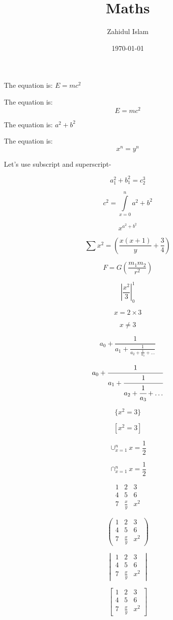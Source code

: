 \documentclass{article}
\title{Maths}
\author{Zahidul Islam }
\date{\today}
\begin{document}
\maketitle

The equation is: $E=mc^2$

The equation is: $$E=mc^2$$

The equation is: \(a^2 + b^2\)

The equation is: \[x^n = y^n\]

Let's use subscript and superscript-

$$a_1^2 + b_1^2 = c_2^3$$

$$c^2 = \int \limits_{x=0}^n a^2 + b^2 $$

$$x^{a^2+b^2}$$

$$\sum{x^2} = \left(\frac{x(x+1)}{y} + \frac{3}{4}\right) $$

$$F = G\left(\frac{m_1m_2}{r^2}\right)$$

$$\left|\frac{x^2}{3}\right|_0^1$$

$$ x = 2 \times 3 $$

$$ x \neq 3 $$

$$ a_0 + \frac{1}{a_1 + \frac{1}{a_2 + \frac{1}{a_3} + \dots}} $$

$$ a_0 + \cfrac{1}{a_1 + \cfrac{1}{a_2 + \cfrac{1}{a_3} + \dots}} $$

$$\{x^2=3\}$$

$$[x^2=3]$$

$$\cup_{x=1}^{n}x = \frac{1}{2}$$

$$\cap_{x=1}^{n}x = \frac{1}{2}$$

$$
\begin{matrix}
1 & 2 & 3\\
4 & 5 & 6\\
7 & \frac{x}{y} & x^2
\end{matrix}
$$

$$
\begin{pmatrix}
1 & 2 & 3\\
4 & 5 & 6\\
7 & \frac{x}{y} & x^2
\end{pmatrix}
$$

$$
\begin{vmatrix}
1 & 2 & 3\\
4 & 5 & 6\\
7 & \frac{x}{y} & x^2
\end{vmatrix}
$$

$$
\begin{bmatrix}
1 & 2 & 3\\
4 & 5 & 6\\
7 & \frac{x}{y} & x^2
\end{bmatrix}
$$
\end{document}
